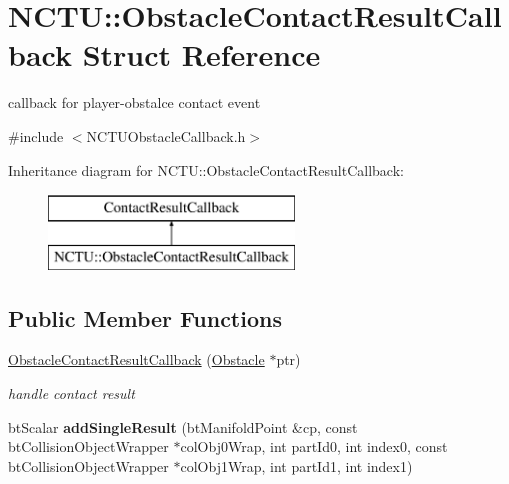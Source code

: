 \hypertarget{struct_n_c_t_u_1_1_obstacle_contact_result_callback}{}\section{N\+C\+TU\+:\+:Obstacle\+Contact\+Result\+Callback Struct Reference}
\label{struct_n_c_t_u_1_1_obstacle_contact_result_callback}


callback for player-\/obstalce contact event  




{\ttfamily \#include $<$N\+C\+T\+U\+Obstacle\+Callback.\+h$>$}

Inheritance diagram for N\+C\+TU\+:\+:Obstacle\+Contact\+Result\+Callback\+:\begin{figure}[H]
\begin{center}
\leavevmode
\includegraphics[height=2.000000cm]{struct_n_c_t_u_1_1_obstacle_contact_result_callback}
\end{center}
\end{figure}
\subsection*{Public Member Functions}
\begin{DoxyCompactItemize}
\item 
\hyperlink{struct_n_c_t_u_1_1_obstacle_contact_result_callback_a78326c84bd2641b4d26810491efe6219}{Obstacle\+Contact\+Result\+Callback} (\hyperlink{class_n_c_t_u_1_1_obstacle}{Obstacle} $\ast$ptr)\hypertarget{struct_n_c_t_u_1_1_obstacle_contact_result_callback_a78326c84bd2641b4d26810491efe6219}{}\label{struct_n_c_t_u_1_1_obstacle_contact_result_callback_a78326c84bd2641b4d26810491efe6219}

\begin{DoxyCompactList}\small\item\em handle contact result \end{DoxyCompactList}\item 
bt\+Scalar {\bfseries add\+Single\+Result} (bt\+Manifold\+Point \&cp, const bt\+Collision\+Object\+Wrapper $\ast$col\+Obj0\+Wrap, int part\+Id0, int index0, const bt\+Collision\+Object\+Wrapper $\ast$col\+Obj1\+Wrap, int part\+Id1, int index1)\hypertarget{struct_n_c_t_u_1_1_obstacle_contact_result_callback_af92b627599b6e4751b267d87d55d82fc}{}\label{struct_n_c_t_u_1_1_obstacle_contact_result_callback_af92b627599b6e4751b267d87d55d82fc}

\end{DoxyCompactItemize}
